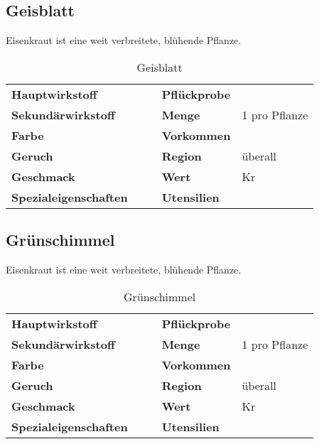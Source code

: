 \subsection{Geisblatt}
Eisenkraut ist eine weit verbreitete, blühende Pflanze. 

\begin{table}[h]
\begin{center}
\begin{tabular}{|l|l|p{1cm}|l|l|}
	\cline{1-2} \cline{4-5}
	\textbf{Hauptwirkstoff} &  && \textbf{Pflückprobe} &  \\ \cline{1-2} \cline{4-5}
	\textbf{Sekundärwirkstoff} &  && \textbf{Menge} & 1 pro Pflanze \\ \cline{1-2} \cline{4-5}
	\textbf{Farbe} &  && \textbf{Vorkommen} &  \\ \cline{1-2} \cline{4-5}
	\textbf{Geruch} &  && \textbf{Region} & überall \\ \cline{1-2} \cline{4-5}
	\textbf{Geschmack} &  && \textbf{Wert} & Kr \\ \cline{1-2} \cline{4-5}
	\textbf{Spezialeigenschaften} &  && \textbf{Utensilien} &  \\ \cline{1-2} \cline{4-5}
\end{tabular}
\end{center}
\caption{Geisblatt}
\label{tab:geisblatt}
\end{table}


\subsection{Grünschimmel}
Eisenkraut ist eine weit verbreitete, blühende Pflanze. 

\begin{table}[h]
\begin{center}
\begin{tabular}{|l|l|p{1cm}|l|l|}
	\cline{1-2} \cline{4-5}
	\textbf{Hauptwirkstoff} &  && \textbf{Pflückprobe} &  \\ \cline{1-2} \cline{4-5}
	\textbf{Sekundärwirkstoff} &  && \textbf{Menge} & 1 pro Pflanze \\ \cline{1-2} \cline{4-5}
	\textbf{Farbe} &  && \textbf{Vorkommen} &  \\ \cline{1-2} \cline{4-5}
	\textbf{Geruch} &  && \textbf{Region} & überall \\ \cline{1-2} \cline{4-5}
	\textbf{Geschmack} &  && \textbf{Wert} & Kr \\ \cline{1-2} \cline{4-5}
	\textbf{Spezialeigenschaften} &  && \textbf{Utensilien} &  \\ \cline{1-2} \cline{4-5}
\end{tabular}
\end{center}
\caption{Grünschimmel}
\label{tab:gruenschimmel}
\end{table}



